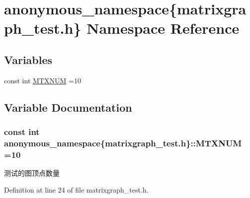 \hypertarget{namespaceanonymous__namespace_02matrixgraph__test_8h_03}{}\section{anonymous\+\_\+namespace\{matrixgraph\+\_\+test.\+h\} Namespace Reference}
\label{namespaceanonymous__namespace_02matrixgraph__test_8h_03}
\subsection*{Variables}
\begin{DoxyCompactItemize}
\item 
const int \hyperlink{namespaceanonymous__namespace_02matrixgraph__test_8h_03_a07b3c20a610653281d3f91b60f576e05}{M\+T\+X\+N\+U\+M} =10
\end{DoxyCompactItemize}


\subsection{Variable Documentation}
\hypertarget{namespaceanonymous__namespace_02matrixgraph__test_8h_03_a07b3c20a610653281d3f91b60f576e05}{}
\subsubsection[{M\+T\+X\+N\+U\+M}]{\setlength{\rightskip}{0pt plus 5cm}const int anonymous\+\_\+namespace\{matrixgraph\+\_\+test.\+h\}\+::M\+T\+X\+N\+U\+M =10}\label{namespaceanonymous__namespace_02matrixgraph__test_8h_03_a07b3c20a610653281d3f91b60f576e05}
测试的图顶点数量 

Definition at line 24 of file matrixgraph\+\_\+test.\+h.

